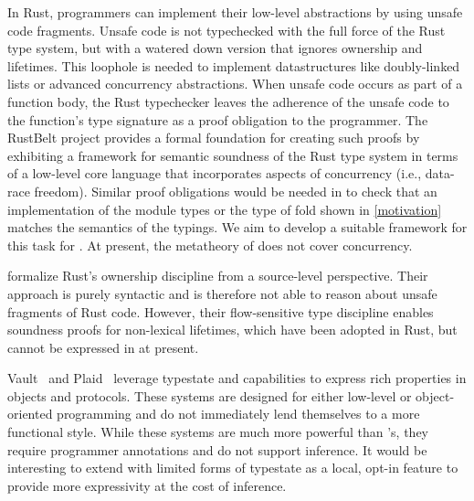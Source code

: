 In Rust, programmers can implement their low-level abstractions by
using unsafe code fragments. Unsafe code is not typechecked with the
full force of the Rust type system, but with a watered down version
that ignores ownership and lifetimes. This loophole is needed to implement
datastructures like doubly-linked lists or advanced concurrency
abstractions. When unsafe code occurs as part of a 
function body, the Rust typechecker leaves the adherence of the unsafe
code to the function's type signature as a proof obligation to
the programmer. The RustBelt project
\cite{DBLP:journals/pacmpl/0002JKD18} provides a formal 
foundation for creating such proofs by exhibiting a framework for
semantic soundness of the Rust type system in terms of a low-level
core language that incorporates aspects
of concurrency (i.e., data-race freedom). Similar proof obligations
would be needed in \lang to check that an implementation of the module
types or the type of fold shown in \cref{motivation} matches the
semantics of the typings. We aim to develop a suitable framework for
this task for \lang. At present, the metatheory of \lang does not
cover concurrency.

\citet{DBLP:journals/corr/abs-1903-00982}
formalize Rust's ownership discipline from a source-level
perspective. Their approach is purely syntactic and is therefore not
able to reason about unsafe fragments of Rust code. However, their
flow-sensitive type discipline enables soundness proofs for
non-lexical lifetimes, which have been adopted in Rust, but cannot be
expressed in \lang at present.


Vault~\citep{DBLP:conf/pldi/DeLineF01}
and Plaid~\citep{DBLP:conf/oopsla/AldrichSSS09,DBLP:journals/toplas/GarciaTWA14}
leverage typestate and capabilities
to express rich properties in objects and protocols.
These systems are designed for either low-level or object-oriented
programming and do not immediately lend themselves to a more functional
style. While these systems are much more
powerful than \affe's, they require programmer annotations
and do not support inference.
It  would be interesting to extend \lang with limited
forms of typestate as a local, opt-in feature to provide
more expressivity at the cost of inference.


